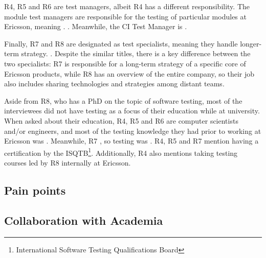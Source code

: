 R4, R5 and R6 are test managers, albeit R4 has a different responsibility.
The module test managers are responsible for the testing of particular modules at Ericsson, meaning .
.
Meanwhile, the CI Test Manager is .

Finally, R7 and R8 are designated as test specialists, meaning they handle longer-term strategy.
.
Despite the similar titles, there is a key difference between the two specialists: R7 is responsible for a long-term strategy of a specific core of Ericsson products, while R8 has an overview of the entire company, so their job also includes sharing technologies and strategies among distant teams.

Aside from R8, who has a PhD on the topic of software testing, most of the interviewees did not have testing as a focus of their education while at university.
When asked about their education, R4, R5 and R6 are computer scientists and/or engineers, and most of the testing knowledge they had prior to working at Ericsson was .
Meanwhile, R7 , so testing was .
R4, R5 and R7 mention having a certification by the ISQTB\footnote{International Software Testing Qualifications Board}.
Additionally, R4 also mentions taking testing courses led by R8 internally at Ericsson.

\subsection{Pain points}

\subsection{Collaboration with Academia}
